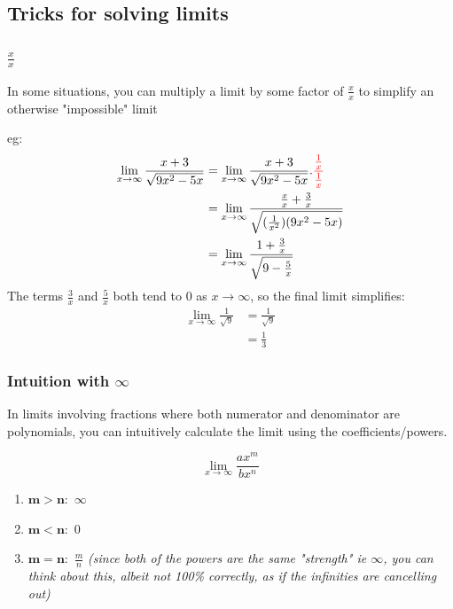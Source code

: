 \documentclass[12pt]{article}
\begin{document}
\subsection{Tricks for solving limits}
\setlength\itemsep{5em}
\subsubsection{\texorpdfstring{$\frac{x}{x}$}{TEXT}}

In some situations, you can multiply a limit by some factor of $\frac{x}{x}$ to simplify an otherwise "impossible" limit

eg:
\begin{equation}
\begin{split}
    \lim_{x\to\infty} \frac{x+3}{\sqrt{9x^2-5x}}
     & = \lim_{x\to\infty} \frac{x+3}{\sqrt{9x^2-5x}} . \textcolor{red}{\frac{\frac{1}{x}}{\frac{1}{x}}}\\
     & = \lim_{x\to\infty} \frac{\frac{x}{x}+\frac{3}{x}}{\sqrt{(\frac{1}{x^2})(9x^2-5x)}}\\
     & = \lim_{x\to\infty} \frac{1+\frac{3}{x}}{\sqrt{9-\frac{5}{x}}}
 \end{split}
\end{equation}      
The terms $\frac{3}{x}$ and $\frac{5}{x}$ both tend to $0$ as $x \to \infty$, so the final limit simplifies:
\begin{equation}
\begin{split}
    \lim_{x\to\infty} \frac{1}{\sqrt{9}}
     & = \frac{1}{\sqrt{9}}\\
     & = \frac{1}{3}
 \end{split}
\end{equation}  

\subsubsection{Intuition with \texorpdfstring{$\infty$}{TEXT}}

In limits involving fractions where both numerator and denominator are polynomials, you can intuitively calculate the limit using the coefficients/powers.

$$
    \lim_{x\to\infty} \frac{ax^{m}}{bx^n}
$$
\begin{enumerate}
    \item $\mathbf{m > n}:$ $\infty$
    \item $\mathbf{m < n}:$ $0$ 
    \item $\mathbf{m = n}:$  $\frac{m}{n}$ \textit{(since both of the powers are the same "strength" ie $\infty$, you can think about this, albeit not 100\% correctly, as if the infinities are cancelling out)}
\end{enumerate}
\end{document}

